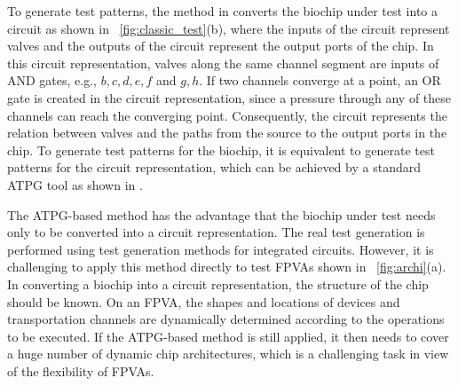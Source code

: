 To generate test patterns, the method in \cite{HuYHC14} converts the
biochip under test into a circuit as shown in
\figname~\ref{fig:classic_test}(b), where the inputs of the circuit
represent valves and the outputs of the circuit represent the output ports
of the chip. In this circuit representation, valves along the same
channel segment are inputs of AND gates, e.g., $b, c, d, e, f$ and $g,
h$. If two channels converge at a point, 
an OR gate is created in the circuit representation, since a pressure through
any of these channels can reach the converging point. Consequently, 
the circuit represents the relation between valves and the paths from the source to
the output ports in the chip.
To generate test patterns for the biochip, it is
equivalent to generate test patterns for the circuit representation, which can
be achieved by a standard ATPG tool as shown in \cite{HuYHC14}.


The ATPG-based method has the advantage that the biochip under test needs only
to be converted into a circuit representation. The real test generation is
performed using test generation methods for integrated circuits.
However, it is challenging to apply this method directly to test FPVAs
shown in \figname~\ref{fig:archi}(a).  
In converting a biochip into a circuit representation, the structure of the chip
should be known.
On an FPVA, the shapes and locations of devices and transportation
channels are dynamically determined according to the operations to be executed.
If the ATPG-based method is still applied, it then needs to cover 
a huge number of dynamic chip architectures, which is 
a challenging task in view of the flexibility of FPVAs.

